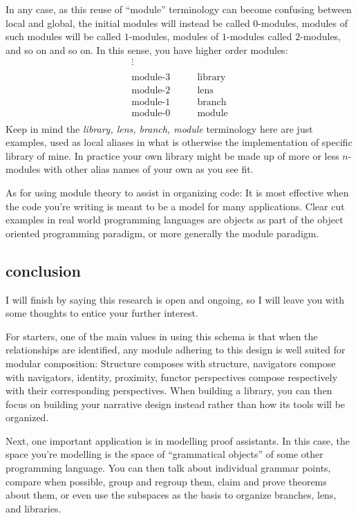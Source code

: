 \documentclass[twoside]{article}
\begin{document}
In any case, as this reuse of ``module'' terminology can become confusing between local and global, the initial modules
will instead be called $ 0 $-modules, modules of such modules will be called $ 1 $-modules, modules of $ 1 $-modules called
$ 2 $-modules, and so on and so on. In this sense, you have higher order modules:
$$\begin{array}{cl}
\vdots		& 				\\
						\\
\mbox{module-3}	& \qquad\mbox{library}		\\
\mbox{module-2}	& \qquad\mbox{lens}		\\
\mbox{module-1}	& \qquad\mbox{branch}		\\
\mbox{module-0}	& \qquad\mbox{module}		\\
\end{array}$$
Keep in mind the \emph{library, lens, branch, module} terminology here are just examples, used as local aliases in what
is otherwise the implementation of specific library of mine. In practice your own library might be made up of more
or less $ n $-modules with other alias names of your own as you see fit.

As for using module theory to assist in organizing code: It is most effective when the code you're writing is meant to
be a model for many applications. Clear cut examples in real world programming languages are objects as part of the
object oriented programming paradigm, or more generally the module paradigm.

\subsection*{conclusion}

I will finish by saying this research is open and ongoing, so I will leave you with some thoughts to entice your further
interest.

For starters, one of the main values in using this schema is that when the relationships are identified, any module
adhering to this design is well suited for modular composition: Structure composes with structure, navigators compose
with navigators, identity, proximity, functor perspectives compose respectively with their corresponding perspectives.
When building a library, you can then focus on building your narrative design instead rather than how its tools will
be organized.

Next, one important application is in modelling proof assistants. In this case, the space you're modelling is the space
of ``grammatical objects'' of some other programming language. You can then talk about individual grammar points, compare
when possible, group and regroup them, claim and prove theorems about them, or even use the subspaces as the basis to
organize branches, lens, and libraries.
\end{document}
